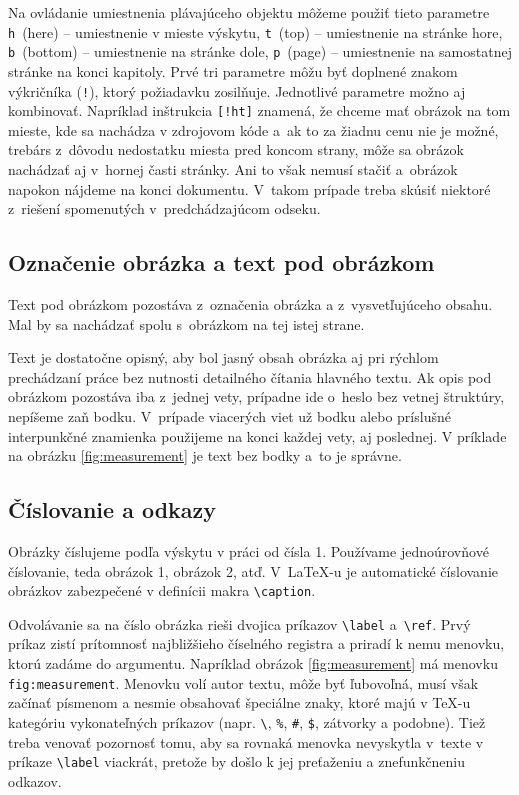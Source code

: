 Na ovládanie umiestnenia plávajúceho objektu môžeme použiť tieto
parametre \verb|h|~(here) -- umiestnenie v mieste výskytu,
\verb|t|~(top) -- umiestnenie na stránke hore, \verb|b|~(bottom) --
umiestnenie na stránke dole, \verb|p|~(page) -- umiestnenie
na samostatnej stránke na konci kapitoly. Prvé tri
parametre môžu byť doplnené znakom výkričníka (\verb|!|),
ktorý požiadavku zosilňuje.
Jednotlivé parametre možno aj kombinovať.
Napríklad inštrukcia \verb|[!ht]| znamená, že chceme mať
obrázok na tom mieste, kde sa nachádza v zdrojovom kóde
a~ak to za žiadnu cenu nie je možné,
trebárs z~dôvodu nedostatku miesta pred koncom strany,
môže sa obrázok nachádzať aj v~hornej časti stránky.
Ani to však nemusí stačiť a~obrázok napokon nájdeme
na konci dokumentu.
V~takom prípade treba skúsiť niektoré
z~riešení spomenutých v~predchádzajúcom odseku.

\subsection{Označenie obrázka a text pod obrázkom}
Text pod obrázkom pozostáva z~označenia obrázka a z~vysvetľujúceho obsahu.
Mal by sa nachádzať spolu s~obrázkom na tej istej strane.

Text je dostatočne opisný,
aby bol jasný obsah obrázka aj pri rýchlom prechádzaní
práce bez nutnosti detailného čítania hlavného textu.
Ak opis pod obrázkom pozostáva iba z~jednej vety,
prípadne ide o~heslo bez vetnej štruktúry,
nepíšeme zaň bodku.
V~prípade viacerých viet už bodku alebo príslušné interpunkčné
znamienka použijeme na konci každej vety,
aj poslednej.
V príklade na obrázku \ref{fig:measurement} je text bez bodky
a~to je správne.

\subsection{Číslovanie a odkazy}
Obrázky číslujeme podľa výskytu v práci od čísla 1.
Používame jednoúrovňové číslovanie,
teda obrázok 1, obrázok 2, atď.
V~\LaTeX-u je automatické číslovanie obrázkov zabezpečené v definícii makra \verb|\caption|.

Odvolávanie sa na číslo obrázka rieši dvojica príkazov \verb|\label| a~\verb|\ref|.
Prvý príkaz zistí prítomnosť najbližšieho číselného
registra a priradí k nemu menovku, ktorú zadáme do argumentu.
Napríklad obrázok \ref{fig:measurement} má menovku \verb|fig:measurement|. Menovku volí autor textu, môže byť ľubovoľná, musí však začínať písmenom a nesmie obsahovať špeciálne znaky, ktoré majú v \TeX-u kategóriu vykonateľných príkazov (napr. \verb|\|, \verb|%|, \verb|#|, \verb|$|, zátvorky a podobne). Tiež treba venovať pozornosť tomu, aby sa rovnaká menovka nevyskytla v~texte v príkaze \verb|\label| viackrát, pretože by došlo k jej preťaženiu a znefunkčneniu odkazov.

